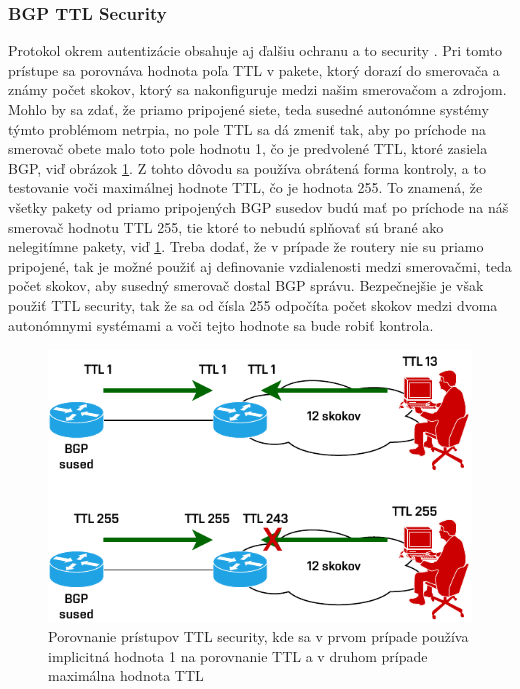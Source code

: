 \subsubsection*{BGP TTL Security}
Protokol  okrem autentizácie obsahuje aj ďalšiu ochranu a to  security \cite{AlHFaPbj6IbKzbuv}. Pri tomto prístupe sa porovnáva hodnota poľa TTL v pakete, ktorý dorazí do smerovača a známy počet skokov, ktorý sa nakonfiguruje medzi našim smerovačom a zdrojom. Mohlo by sa zdať, že priamo pripojené siete, teda susedné autonómne systémy týmto problémom netrpia, no pole TTL sa dá zmeniť tak, aby po príchode na smerovač obete malo toto pole hodnotu 1, čo je predvolené TTL, ktoré zasiela BGP, viď obrázok \ref{fig:ttl-sec}. Z tohto dôvodu sa používa obrátená forma kontroly, a to testovanie voči maximálnej hodnote TTL, čo je hodnota 255. To znamená, že všetky pakety od priamo pripojených BGP susedov budú mať po príchode na náš smerovač hodnotu TTL 255, tie ktoré to nebudú splňovať sú brané ako nelegitímne pakety, viď \ref{fig:ttl-sec}. Treba dodať, že v prípade že routery nie su priamo pripojené, tak je možné použiť aj definovanie vzdialenosti medzi smerovačmi, teda počet skokov, aby susedný smerovač dostal BGP správu. Bezpečnejšie je však použiť TTL security, tak že sa od čísla 255 odpočíta počet skokov medzi dvoma autonómnymi systémami a voči tejto hodnote sa bude robiť kontrola.

\begin{figure}[H]
	\begin{center}
		\includegraphics[scale=1]{obrazky/ttl-sec.pdf}
	\end{center}
	\caption[Porovnanie prístupov TTL security]{Porovnanie prístupov TTL security, kde sa v prvom prípade používa implicitná hodnota 1 na porovnanie TTL a v druhom prípade maximálna hodnota TTL \cite{AlHFaPbj6IbKzbuv}}
	\label{fig:ttl-sec}
\end{figure} 


